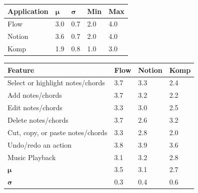 		\begin{table}[!htpb]
		  \centering
		   \label{tab:app-usability-scores}
		  \begin{tabular}{|p{3cm}|R{1cm}|R{1cm}|R{1cm}|R{1cm}|}
		  	\hline
		  	\textbf{Application} & \begin{math}\bm{\mu}\end{math} & \begin{math}\bm{\sigma}\end{math} & \textbf{Min} & \textbf{Max} \\ \hline

		  	Flow 	& 3.0 & 0.7 & 2.0 & 4.0 \\ \hline
		  	Notion 	& 3.6 & 0.7 & 2.0 & 4.0 \\ \hline 
		  	Komp 	& 1.9 & 0.8 & 1.0 & 3.0 \\ \hline
			
		  \end{tabular}
		\end{table}


		\begin{table}[H]
		  \centering
		   \label{tab:compare-i3}
		  \begin{tabular}{|p{6cm}|R{1.5cm}|R{1.5cm}|R{1.5cm}|}
		  	\hline 
		  	\textbf{Feature} & \textbf{Flow} & \textbf{Notion} & \textbf{Komp} \\ \hline

			Select or highlight notes/chords 		& 3.7 & 3.3 & 2.4 \\ \hline
			Add notes/chords 							& 3.7 & 3.2 & 2.2 \\ \hline
			Edit notes/chords 							& 3.3 & 3.0 & 2.5 \\ \hline
			Delete notes/chords 						& 3.7 & 2.6 & 3.2 \\ \hline
			Cut, copy, or paste notes/chords 	& 3.3 & 2.8 & 2.0 \\ \hline
			Undo/redo an action 						& 3.8 & 3.9 & 3.6 \\ \hline
			Music Playback 								& 3.1 & 3.2 & 2.8 \\ \hline

			\begin{math}\bm{\mu}\end{math} 		& 3.5 & 3.1 & 2.7 \\ \hline
			\begin{math}\bm{\sigma}\end{math} 	& 0.3 & 0.4 & 0.6 \\ \hline
		  \end{tabular}
		\end{table}

